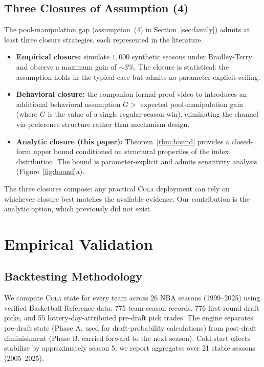 \documentclass{article}
\newcommand{\cola}{\textup{\textsc{Cola}}}
\begin{document}
\subsection{Three Closures of Assumption (4)}

The pool-manipulation gap (assumption~(4) in Section~\ref{sec:family}) admits at least three closure strategies, each represented in the literature.
\begin{itemize}
\item \textbf{Empirical closure:} \citet{highley2026cola} simulate $1{,}000$ synthetic seasons under Bradley-Terry and observe a maximum gain of $\sim 3\%$. The closure is statistical: the assumption holds in the typical case but admits no parameter-explicit ceiling.
\item \textbf{Behavioral closure:} the companion formal-proof video to \citep{highley2026cola} introduces an additional behavioral assumption $G > $ expected pool-manipulation gain (where $G$ is the value of a single regular-season win), eliminating the channel via preference structure rather than mechanism design.
\item \textbf{Analytic closure (this paper):} Theorem~\ref{thm:bound} provides a closed-form upper bound conditioned on structural properties of the index distribution. The bound is parameter-explicit and admits sensitivity analysis (Figure~\ref{fig:bound}a).
\end{itemize}
The three closures compose: any practical \cola{} deployment can rely on whichever closure best matches the available evidence. Our contribution is the analytic option, which previously did not exist.

\section{Empirical Validation}
\label{sec:empirical}

\subsection{Backtesting Methodology}

We compute \cola{} state for every team across 26 NBA seasons (1999--2025) using verified Basketball Reference data: 775 team-season records, 776 first-round draft picks, and 55 lottery-day-attributed pre-draft pick trades. The engine separates pre-draft state (Phase A, used for draft-probability calculations) from post-draft diminishment (Phase B, carried forward to the next season). Cold-start effects stabilize by approximately season 5; we report aggregates over 21 stable seasons (2005--2025).
\end{document}
